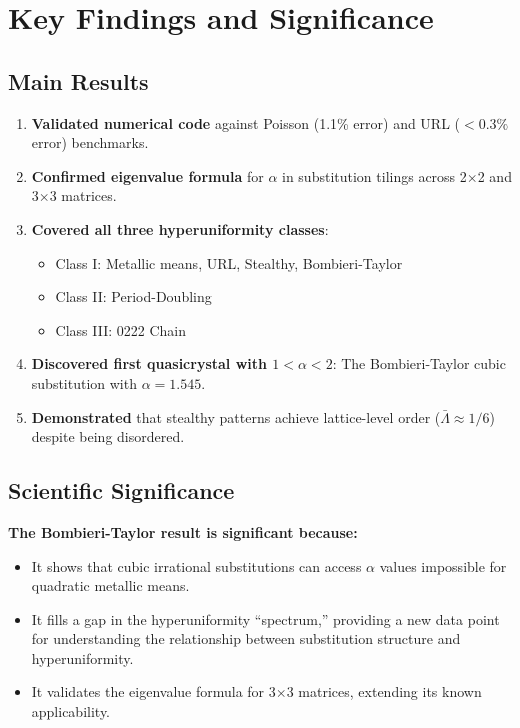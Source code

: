 \documentclass[11pt,letterpaper]{article}
\begin{document}
\section{Key Findings and Significance}

\subsection{Main Results}

\begin{enumerate}
    \item \textbf{Validated numerical code} against Poisson (1.1\% error) and URL ($<0.3\%$ error) benchmarks.

    \item \textbf{Confirmed eigenvalue formula} for $\alpha$ in substitution tilings across 2$\times$2 and 3$\times$3 matrices.

    \item \textbf{Covered all three hyperuniformity classes}:
    \begin{itemize}
        \item Class I: Metallic means, URL, Stealthy, Bombieri-Taylor
        \item Class II: Period-Doubling
        \item Class III: 0222 Chain
    \end{itemize}

    \item \textbf{Discovered first quasicrystal with $1 < \alpha < 2$}: The Bombieri-Taylor cubic substitution with $\alpha = 1.545$.

    \item \textbf{Demonstrated} that stealthy patterns achieve lattice-level order ($\bar{\Lambda} \approx 1/6$) despite being disordered.
\end{enumerate}

\subsection{Scientific Significance}

\textbf{The Bombieri-Taylor result is significant because:}

\begin{itemize}
    \item It shows that cubic irrational substitutions can access $\alpha$ values impossible for quadratic metallic means.

    \item It fills a gap in the hyperuniformity ``spectrum,'' providing a new data point for understanding the relationship between substitution structure and hyperuniformity.

    \item It validates the eigenvalue formula for 3$\times$3 matrices, extending its known applicability.
\end{itemize}
\end{document}
